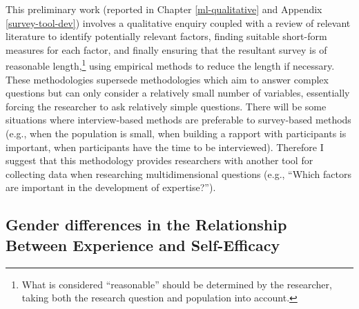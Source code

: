 \documentclass[
  12pt,
  a4paper,
]{book}
\begin{document}
This preliminary work (reported in Chapter \ref{ml-qualitative} and Appendix \ref{survey-tool-dev}) involves a qualitative enquiry coupled with a review of relevant literature to identify potentially relevant factors, finding suitable short-form measures for each factor, and finally ensuring that the resultant survey is of reasonable length,\footnote{What is considered ``reasonable'' should be determined by the researcher, taking both the research question and population into account.} using empirical methods to reduce the length if necessary. These methodologies supersede methodologies which aim to answer complex questions but can only consider a relatively small number of variables, essentially forcing the researcher to ask relatively simple questions. There will be some situations where interview-based methods are preferable to survey-based methods (e.g., when the population is small, when building a rapport with participants is important, when participants have the time to be interviewed). Therefore I suggest that this methodology provides researchers with another tool for collecting data when researching multidimensional questions (e.g., ``Which factors are important in the development of expertise?'').

\hypertarget{gender-differences-in-the-relationship-between-experience-and-self-efficacy}{%
\subsection{Gender differences in the Relationship Between Experience and Self-Efficacy}\label{gender-differences-in-the-relationship-between-experience-and-self-efficacy}}
\end{document}
